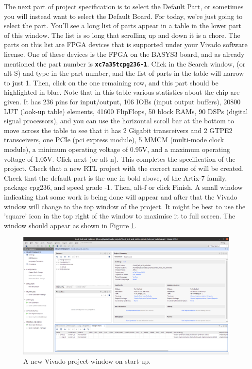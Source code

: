 \documentclass[../physical_computing.tex]{subfiles}
\begin{document}
The next part of project specification is to select the Default Part, or sometimes you will instead want to select the Default Board. For today, we're just going to select the part. You'll see a long list of parts appear in a table in the lower part of this window. The list is so long that scrolling up and down it is a chore. The parts on this list are FPGA devices that is supported under your Vivado software license. One of these devices is the FPGA on the BASYS3 board, and as already mentioned the part number is \texttt{\bf xc7a35tcpg236-1}. Click in the Search window, (or alt-S) and type in the part number, and the list of parts in the table will narrow to just 1. Then, click on the one remaining row, and this part should be highlighted in blue. Note that in this table various statistics about the chip are given. It has 236 pins for input/output, 106 IOBs (input output buffers), 20800 LUT (look-up table) elements, 41600 FlipFlops, 50 block RAMs, 90 DSPs (digital signal processors), and you can use the horizontal scroll bar at the bottom to move across the table to see that it has 2 Gigabit transceivers and 2 GTPE2 transceivers, one PCIe (pci express module), 5 MMCM (multi-mode clock module), a minimum operating voltage of 0.95V, and a maximum operating voltage of 1.05V. Click next (or alt-n). This completes the specification of the project. Check that a new RTL project with the correct name of  will be created. Check that the default part is the one in bold above, of the Artix-7 family, package cpg236, and speed grade -1. Then, alt-f or click Finish. A small window indicating that some work is being done will appear and after that the Vivado window will change to the top window of the project. It might be best to use the 'square' icon in the top right of the window to maximise it to full screen. The window should appear as shown in Figure \ref{fig:vivado_project}.

\begin{figure}
    \centering
    \includegraphics[width=\textwidth]{chapter_1/figures/create_new_vivado_project.png}
    \caption{A new Vivado project window on start-up.}
    \label{fig:vivado_project}
\end{figure}
\end{document}
